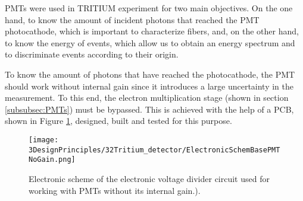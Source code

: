 PMTs were used in TRITIUM experiment for two main objectives. On the one hand, to know the amount of incident photons that reached the PMT photocathode, which is important to characterize fibers, and, on the other hand, to know the energy of events, which allow us to obtain an energy spectrum and to discriminate events according to their origin. %

To know the amount of photons that have reached the photocathode, the PMT should work without internal gain since it introduces a large uncertainty in the measurement. To this end, the electron multiplication stage (shown in section \ref{subsubsec:PMTs}) must be bypassed. This is achieved with the help of a PCB, shown in Figure \ref{fig:ElectronicSchemeBasePMTNoGain}, designed, built and tested for this purpose.  


\begin{figure}[htbp]
\centering
\texttt{[image: 3DesignPrinciples/32Tritium\_detector/ElectronicSchemBasePMTNoGain.png]}
\caption{Electronic scheme of the electronic voltage divider circuit used for working with PMTs without its internal gain.).\label{fig:ElectronicSchemeBasePMTNoGain}}
\end{figure}

